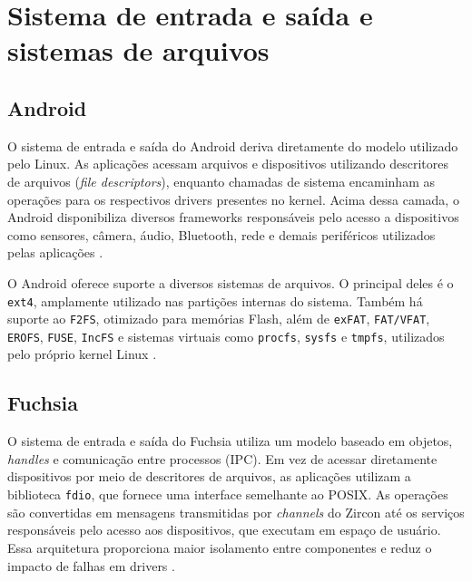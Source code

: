 \documentclass[12pt,a4paper]{article}
\begin{document}

\section{Sistema de entrada e saída e sistemas de arquivos}
\label{sec:io}

\subsection{Android}

O sistema de entrada e saída do Android deriva diretamente do modelo utilizado
pelo Linux. As aplicações acessam arquivos e dispositivos utilizando
descritores de arquivos (\emph{file descriptors}), enquanto chamadas de sistema
encaminham as operações para os respectivos drivers presentes no kernel. Acima
dessa camada, o Android disponibiliza diversos frameworks responsáveis pelo
acesso a dispositivos como sensores, câmera, áudio, Bluetooth, rede e demais
periféricos utilizados pelas aplicações \cite{aosp}.

O Android oferece suporte a diversos sistemas de arquivos. O principal deles é
o \texttt{ext4}, amplamente utilizado nas partições internas do sistema. Também
há suporte ao \texttt{F2FS}, otimizado para memórias Flash, além de
\texttt{exFAT}, \texttt{FAT/VFAT}, \texttt{EROFS}, \texttt{FUSE},
\texttt{IncFS} e sistemas virtuais como \texttt{procfs}, \texttt{sysfs} e
\texttt{tmpfs}, utilizados pelo próprio kernel Linux
\cite{android_filesystems}.

\subsection{Fuchsia}

O sistema de entrada e saída do Fuchsia utiliza um modelo baseado em objetos,
\emph{handles} e comunicação entre processos (IPC). Em vez de acessar
diretamente dispositivos por meio de descritores de arquivos, as aplicações
utilizam a biblioteca \texttt{fdio}, que fornece uma interface semelhante ao
POSIX. As operações são convertidas em mensagens transmitidas por
\emph{channels} do Zircon até os serviços responsáveis pelo acesso aos
dispositivos, que executam em espaço de usuário. Essa arquitetura proporciona
maior isolamento entre componentes e reduz o impacto de falhas em drivers
\cite{zircon,fuchsia_io}.
\end{document}
